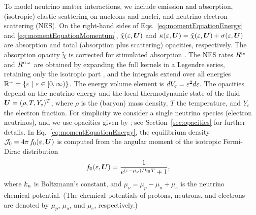 \documentclass[10pt,preprint]{aastex}
\begin{document}
To model neutrino matter interactions, we include emission and absorption, (isotropic) elastic scattering on nucleons and nuclei, and neutrino-electron scattering (NES).  
On the right-hand sides of Eqs.~\eqref{eq:momentEquationEnergy} and \eqref{eq:momentEquationMomentum}, $\tilde{\chi}(\varepsilon,\boldsymbol{U})$ and $\kappa(\varepsilon,\boldsymbol{U})=\tilde{\chi}(\varepsilon,\boldsymbol{U})+\sigma(\varepsilon,\boldsymbol{U})$ are absorption and total (absorption plus scattering) opacities, respectively.  
The absorption opacity $\tilde{\chi}$ is corrected for stimulated absorption \citep[cf.][]{mezzacappaBruenn_1993a}.  
The NES rates $R^{\mbox{\tiny In}}$ and $R^{\mbox{\tiny Out}}$ are obtained by expanding the full kernels in a Legendre series, retaining only the isotropic part \citep[see, e.g.,][]{cernohorsky_1994}, and the integrals extend over all energies $\mathbb{R}^{+}=\{\varepsilon~|~\varepsilon\in[0,\infty)\}$.  
The energy volume element is $dV_{\varepsilon}=\varepsilon^{2}d\varepsilon$.  
The opacities depend on the neutrino energy and the local thermodynamic state of the fluid $\boldsymbol{U}=(\rho,T,Y_{e})^{T}$, where $\rho$ is the (baryon) mass density, $T$ the temperature, and $Y_{e}$ the electron fraction.  
For simplicity we consider a single neutrino species (electron neutrinos), and we use opacities given by \citet{bruenn_1985}; see Section~\ref{sec:opacities} for further details.  
In Eq.~\eqref{eq:momentEquationEnergy}, the equilibrium density $\mathcal{J}_{0}=4\pi\,f_{0}(\varepsilon,\boldsymbol{U})$ is computed from the angular moment of the isotropic Fermi-Dirac distribution
\begin{equation}
  f_{0}(\varepsilon,\boldsymbol{U})=\frac{1}{e^{(\varepsilon-\mu_{\nu})/k_{\mbox{\tiny B}}T}+1},
\end{equation}
where $k_{\mbox{\tiny B}}$ is Boltzmann's constant, and $\mu_{\nu}=\mu_{p}-\mu_{n}+\mu_{e}$ is the neutrino chemical potential.  
(The chemical potentials of protons, neutrons, and electrons are denoted by $\mu_{p}$, $\mu_{n}$, and $\mu_{e}$, respectively.)
\end{document}
